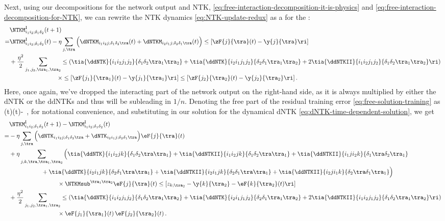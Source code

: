 Next, using our decompositions for the network output and NTK, \eqref{eq:free-interaction-decomposition-it-is-physics} and \eqref{eq:free-interaction-decomposition-for-NTK}, we can rewrite the NTK dynamics \eqref{eq:NTK-update-redux} as a  for the :
\begin{align}\label{eq:interacting-NTK-dynamics-unsimplified}
&\NTKM^{\text{I}}_{i_1i_2;\delta_1\delta_2}(t+1) \, \\
=&\NTKM^{\text{I}}_{i_1i_2;\delta_1\delta_2}(t)-\eta\sum_{j,\tra}\Big(\dNTKM_{i_1 i_2j;\delta_1\delta_2\tra}(t)+\dNTKM_{i_2 i_1j;\delta_2\delta_1\tra}(t)\Big)\le[\zF{j}{\tra}(t)-\y{j}{\tra}\ri]\, \notag\\
&+\frac{\eta^2}{2}\sum_{j_1,j_2,\tra_1,\tra_2}\le(\tia{\ddNTK}{i_1i_2j_1j_2}{\delta_1\delta_2\tra_1\tra_2}+\tia{\ddNTK}{i_2i_1j_1j_2}{\delta_2\delta_1\tra_1\tra_2} + 2\tia{\ddNTKII}{i_1i_2j_1j_2}{\delta_1\delta_2\tra_1\tra_2} \ri) \, \notag\\ 
&\qquad\qquad\qquad\qquad\times\le[\zF{j_1}{\tra_1}(t)-\y{j_1}{\tra_1}\ri]\le[\zF{j_2}{\tra_2}(t)-\y{j_2}{\tra_2}\ri] \, .\notag %
\end{align}
Here, once again, we've dropped the interacting part of the network output on the right-hand side, as it is always multiplied by either the dNTK or the ddNTKs and thus will be subleading in $1/n$. Denoting the free part of the residual training error \eqref{eq:free-solution-training} as
\be\label{eq:free-residual-training-error}
(t)\equiv{}(t)-\, ,
\ee
for notational convenience, and substituting in our solution for the dynamical  dNTK  \eqref{eq:dNTK-time-dependent-solution},  we get
\begin{align}\label{eq:interacting-NTK-dynamics-unsimplified-substituted}
&\NTKM^{\text{I}}_{i_1i_2;\delta_1\delta_2}(t+1)-\NTKM^{\text{I}}_{i_1i_2;\delta_1\delta_2}(t) \, \\
=&-\eta\sum_{j,\tra}\Big(\dNTK_{i_1 i_2j;\delta_1\delta_2\tra}+\dNTK_{i_2 i_1j;\delta_2\delta_1\tra}\Big)\eF{j}{\tra}(t)\, \notag\\
&+ \eta\sum_{j,k,\tra,\tra_1,\tra_2}\Big(
\tia{\ddNTK}{i_1i_2 j k}{\delta_1\delta_2\tra\tra_1}+
\tia{\ddNTKII}{i_1i_2 j k}{\delta_1\delta_2\tra\tra_1}+
\tia{\ddNTKII}{i_1ji_2  k}{\delta_1\tra\delta_2\tra_1}
\, \notag \\
&\qquad\qquad\quad\ 
+\tia{\ddNTK}{i_2i_1 j k}{\delta_2\delta_1\tra\tra_1}
+\tia{\ddNTKII}{i_2i_1 j k}{\delta_2\delta_1\tra\tra_1}
+\tia{\ddNTKII}{i_2ji_1  k}{\delta_2\tra\delta_1\tra_1}
\Big) \, \notag \\
&\qquad\qquad\qquad\qquad\times\NTKMsub^{\tra_1\tra_2}\eF{j}{\tra}(t)\le[ z_{k;\tra_2}-\y{k}{\tra_2}- \eF{k}{\tra_2}(t)\ri] \notag \, \\
&+\frac{\eta^2}{2}\sum_{j_1,j_2,\tra_1,\tra_2}\le(\tia{\ddNTK}{i_1i_2j_1j_2}{\delta_1\delta_2\tra_1\tra_2}+\tia{\ddNTK}{i_2i_1j_1j_2}{\delta_2\delta_1\tra_1\tra_2} + 2\tia{\ddNTKII}{i_1i_2j_1j_2}{\delta_1\delta_2\tra_1\tra_2} \ri) \, \notag\\ 
&\qquad\qquad\qquad\qquad\times\eF{j_1}{\tra_1}(t)\, \eF{j_2}{\tra_2}(t) \notag
\, .
\end{align}
